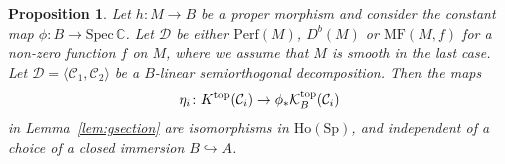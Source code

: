 \documentclass [11pt,oneside,a4paper,mathscr]{amsart}
\newtheorem{prop}[thm]{Proposition}
\theoremstyle{definition}
\begin{document}
\begin{prop}\label{prop:gsection}
Let $h \colon M \to B$ be a proper morphism and consider the constant map $\phi\colon B\to \mathrm{Spec}\,\mathbb{C}$. 
	Let $\mathscr{D}$ be either $\mathrm{Perf}(M)$, $D^b(M)$ 
	or $\mathrm{MF}(M, f)$ for a non-zero function $f$ on $M$, 
	where we assume that $M$ is smooth in the last case. 
	Let $\mathscr{D}=\langle \mathcal{C}_1, \mathcal{C}_2 \rangle$ be a 
	$B$-linear semiorthogonal decomposition. 
	Then the maps 
	\begin{align*}
		\eta_i \colon K^{\rm{top}}(\mathcal{C}_i) \to \phi_{\ast}\mathcal{K}_B^{\rm{top}}(\mathcal{C}_i)
	\end{align*}
	in Lemma~\ref{lem:gsection} are isomorphisms in $\mathrm{Ho}(\mathrm{Sp})$, and independent 
    of a choice of a closed immersion $B\hookrightarrow A$. 
\end{prop}
\end{document}
